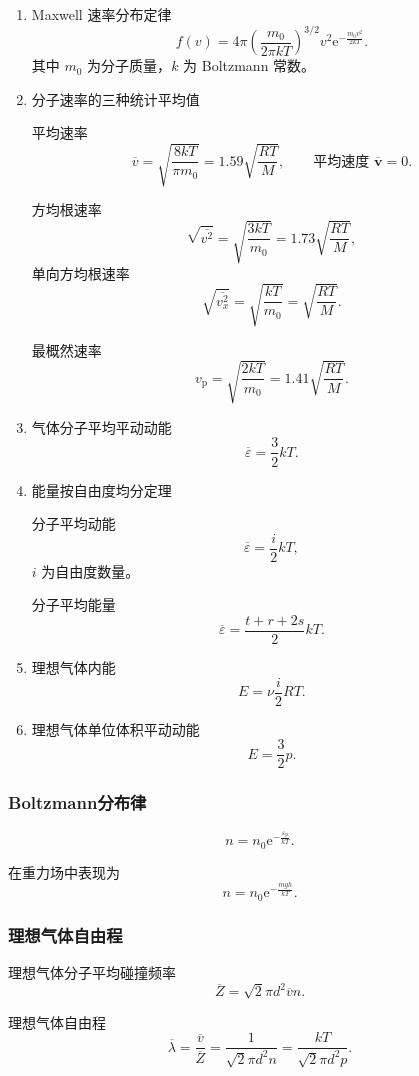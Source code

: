 \documentclass[UTF8,fontset=fandol,zihao=5]{ctexart}
\newcommand{\ee}{\mathrm{e}}
\newcommand{\vect}[1]{\bm{#1}}
\begin{document}
\begin{enumerate}
  \item Maxwell 速率分布定律
  \[
    f(v)=4\pi\left(\frac{m_0}{2\pi kT}\right)^{3/2}v^2\ee^{-\frac{m_0v^2}{2kT}}.
  \]
  其中 \(m_0\) 为分子质量，\(k\) 为 Boltzmann 常数。

  \item 分子速率的三种统计平均值

  平均速率
  \[
    \overline v=\sqrt{\frac{8kT}{\pi m_0}}=1.59\sqrt{\frac{RT}{M}},
    \qquad
    \text{平均速度 }\overline{\vect v}=0.
  \]

  方均根速率
  \[
    \sqrt{\overline{v^2}}=\sqrt{\frac{3kT}{m_0}}=1.73\sqrt{\frac{RT}{M}},
  \]
  单向方均根速率
  \[
    \sqrt{\overline{v_x^2}}=\sqrt{\frac{kT}{m_0}}=\sqrt{\frac{RT}{M}}.
  \]

  最概然速率
  \[
    v_{\mathrm p}=\sqrt{\frac{2kT}{m_0}}=1.41\sqrt{\frac{RT}{M}}.
  \]

  \item 气体分子平均平动动能
  \[
    \overline\varepsilon=\frac32kT.
  \]

  \item 能量按自由度均分定理

  分子平均动能
  \[
    \overline\varepsilon=\frac i2kT,
  \]
  \(i\) 为自由度数量。

  分子平均能量
  \[
    \overline\varepsilon=\frac{t+r+2s}{2}kT.
  \]

  \item 理想气体内能
  \[
    E=\nu\frac i2RT.
  \]

  \item 理想气体单位体积平动动能
  \[
    E=\frac32p.
  \]
\end{enumerate}

\subsubsection{Boltzmann分布律}

\[
  n=n_0\ee^{-\frac{\varepsilon_{\mathrm p}}{kT}}.
\]

在重力场中表现为
\[
  n=n_0\ee^{-\frac{mgh}{kT}}.
\]

\subsubsection{理想气体自由程}

理想气体分子平均碰撞频率
\[
  \overline Z=\sqrt2\pi d^2\overline v n.
\]

理想气体自由程
\[
  \overline\lambda=\frac{\overline v}{\overline Z}
  =\frac{1}{\sqrt2\pi d^2n}
  =\frac{kT}{\sqrt2\pi d^2p}.
\]
\end{document}
